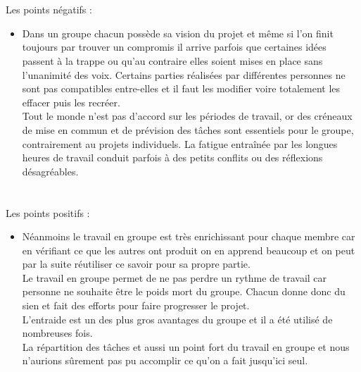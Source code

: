 \documentclass[titlepage, 13px, a4paper]{article}
\begin{document}
\paragraph{} \hspace{0pt} \\
Les points négatifs :
{\begin{itemize}
	\item	Dans un groupe chacun possède sa vision du projet et même si l'on finit toujours par trouver un compromis il arrive parfois que 
		certaines idées passent à la trappe ou qu'au contraire elles soient mises en place sans l'unanimité des voix.
		Certains parties réalisées par différentes personnes ne sont pas compatibles entre-elles et il faut les modifier voire totalement 
		les effacer puis les recréer. \\
		Tout le monde n'est pas d'accord sur les périodes de travail, or des créneaux de mise en commun
		et de prévision des tâches sont essentiels pour le groupe, contrairement au projets individuels.
		La fatigue entraînée par les longues heures de travail conduit parfois à des petits conflits ou des réflexions désagréables. \\
\end{itemize}} 

\paragraph{} \hspace{0pt} \\
Les points positifs :
{\begin{itemize}
	\item	Néanmoins le travail en groupe est très enrichissant pour chaque membre car en vérifiant ce que les autres ont produit 
		on en apprend beaucoup et on peut par la suite réutiliser ce savoir pour sa propre partie. \\
		Le travail en groupe permet de ne pas perdre un rythme de travail car personne ne souhaite être le poids mort du groupe. 
		Chacun donne donc du sien et fait des efforts pour faire progresser le projet. \\
		L’entraide est un des plus gros avantages du groupe et il a été utilisé de nombreuses fois. \\
		La répartition des tâches et aussi un point fort du travail en groupe et nous n'aurions sûrement 
		pas pu accomplir ce qu'on a fait jusqu'ici seul. \\
\end{itemize}} 
\end{document}
